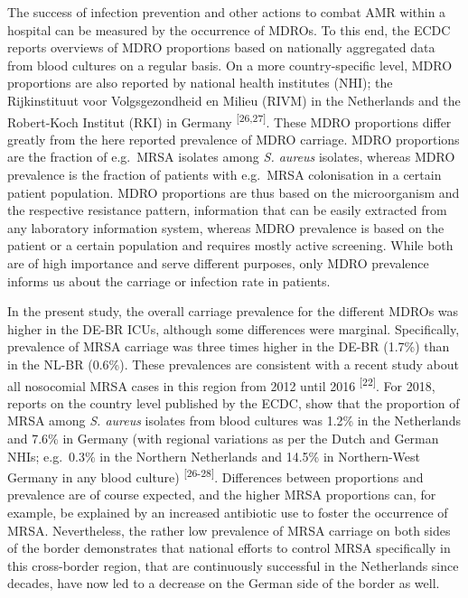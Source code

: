 \documentclass[
]{book}
\begin{document}
The success of infection prevention and other actions to combat AMR within a hospital can be measured by the occurrence of MDROs. To this end, the ECDC reports overviews of MDRO proportions based on nationally aggregated data from blood cultures on a regular basis. On a more country-specific level, MDRO proportions are also reported by national health institutes (NHI); the Rijkinstituut voor Volgsgezondheid en Milieu (RIVM) in the Netherlands and the Robert-Koch Institut (RKI) in Germany \textsuperscript{{[}26,27{]}}. These MDRO proportions differ greatly from the here reported prevalence of MDRO carriage. MDRO proportions are the fraction of e.g.~MRSA isolates among \emph{S. aureus} isolates, whereas MDRO prevalence is the fraction of patients with e.g.~MRSA colonisation in a certain patient population. MDRO proportions are thus based on the microorganism and the respective resistance pattern, information that can be easily extracted from any laboratory information system, whereas MDRO prevalence is based on the patient or a certain population and requires mostly active screening. While both are of high importance and serve different purposes, only MDRO prevalence informs us about the carriage or infection rate in patients.

In the present study, the overall carriage prevalence for the different MDROs was higher in the DE-BR ICUs, although some differences were marginal. Specifically, prevalence of MRSA carriage was three times higher in the DE-BR (1.7\%) than in the NL-BR (0.6\%). These prevalences are consistent with a recent study about all nosocomial MRSA cases in this region from 2012 until 2016 \textsuperscript{{[}22{]}}. For 2018, reports on the country level published by the ECDC, show that the proportion of MRSA among \emph{S. aureus} isolates from blood cultures was 1.2\% in the Netherlands and 7.6\% in Germany (with regional variations as per the Dutch and German NHIs; e.g.~0.3\% in the Northern Netherlands and 14.5\% in Northern-West Germany in any blood culture) \textsuperscript{{[}26-28{]}}. Differences between proportions and prevalence are of course expected, and the higher MRSA proportions can, for example, be explained by an increased antibiotic use to foster the occurrence of MRSA. Nevertheless, the rather low prevalence of MRSA carriage on both sides of the border demonstrates that national efforts to control MRSA specifically in this cross-border region, that are continuously successful in the Netherlands since decades, have now led to a decrease on the German side of the border as well.
\end{document}
